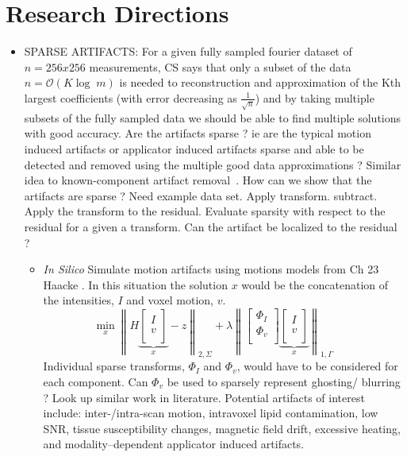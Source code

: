 \documentclass[10pt]{amsart}
\begin{document}
\section{Research Directions }

\begin{itemize}
 \item
     {\color{red} SPARSE ARTIFACTS}:  For a given fully sampled fourier
dataset of $n  = 256x256 $ measurements, CS says that only a subset of the
data $ n =  \mathcal{O}(K \log  \; m)$ is needed to reconstruction and
approximation of the Kth largest coefficients (with error decreasing as
$\frac{1}{\sqrt{n}}$) and by taking multiple subsets of the fully sampled
data we should be able to find multiple solutions with good accuracy.
Are the artifacts sparse ?  ie are the typical motion induced artifacts
or applicator induced artifacts sparse and able to be detected and removed
using the multiple good data approximations ? 
Similar idea to known-component artifact removal~\cite{stayman2012model}.
How can we show that the artifacts are sparse ? Need example data set. Apply
transform. subtract. Apply the transform to the residual. Evaluate sparsity
with respect to the residual for a given a transform. Can the artifact be
localized to the residual ? 
  \begin{itemize}
   \item \textit{In Silico} Simulate motion artifacts using motions models
from  Ch 23 Haacke  \cite{Haacke1999}. In this situation the solution $x$
would be the concatenation of the intensities, $I$ and voxel motion, $v$.
\[
   \min_{x} 
   \left\| H
   \underbrace{
    \begin{bmatrix}
       I \\
       v \\
    \end{bmatrix}}_{x} 
       -z 
   \right\|_{2,\Sigma} + \lambda 
  \left\| 
    \begin{bmatrix}
       \Phi_I \\
       \Phi_v \\
    \end{bmatrix}
   \underbrace{
    \begin{bmatrix}
       I \\
       v \\
    \end{bmatrix}}_{x} 
   \right \|_{1,\Gamma} \qquad 
\]
   Individual sparse transforms, $\Phi_I$ and $\Phi_v$, would have to be considered for each
component. Can $\Phi_v$ be used to sparsely represent ghosting/ blurring ?
Look up similar work in literature. Potential artifacts of interest
include: inter-/intra-scan motion,
intravoxel lipid contamination, low SNR, tissue susceptibility changes,
magnetic field drift, excessive heating, and modality–dependent applicator
induced artifacts.
  \end{itemize}
           

\end{itemize}
\end{document}
